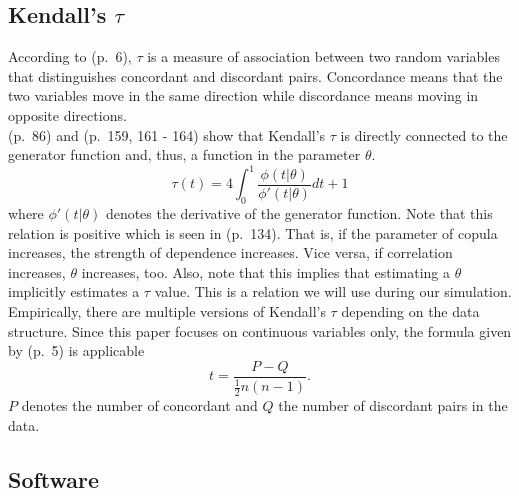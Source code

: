 \documentclass[
]{krantz}
\begin{document}
\subsection{\texorpdfstring{Kendall's \(\tau\)}{Kendall's \textbackslash tau}}\label{kendallstau}

According to \citet{kendall1990} (p.~6), \(\tau\) is a measure of association
between two random variables that distinguishes concordant and
discordant pairs. Concordance means that the two variables move in the same
direction while discordance means moving in opposite directions.\\
\citet{zhang2019} (p.~86) and \citet{nelsen2006} (p.~159,
161 - 164) show that Kendall's \(\tau\) is directly connected to the generator function and, thus,
a function in the parameter \(\theta\).\\
\[
\tau(t)= 4 \int_0^1 \frac{\phi(t|\theta)}{\phi'(t|\theta)}dt + 1
\label{eq:cKendall}
\]
where \(\phi'(t|\theta)\) denotes the derivative of the generator function. Note that this relation is positive
which is seen in \citet{zhang2019} (p.~134). That is, if the parameter of copula increases, the strength of dependence
increases. Vice versa, if correlation increases, \(\theta\) increases, too. Also, note that this implies that
estimating a \(\theta\) implicitly estimates a \(\tau\) value.
This is a relation we will use during our simulation.\\
Empirically, there are multiple versions of Kendall's \(\tau\) depending
on the data structure. Since this paper focuses on continuous variables
only, the formula given by \citet{kendall1990} (p.~5) is applicable\\
\[
t = \frac{P-Q}{\frac{1}{2}n(n-1)}.
\label{eq:eKendall}
\]
\(P\) denotes the number of concordant and \(Q\) the number of
discordant pairs in the data.

\subsection{Software}\label{software}
\end{document}
